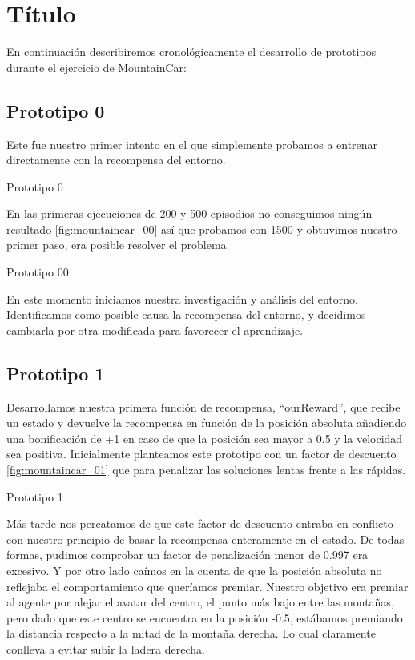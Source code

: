 
\chapter{Título}
\label{Appendix:Key1}

En continuación describiremos cronológicamente el desarrollo de prototipos durante el ejercicio de MountainCar:

\section{Prototipo 0}
Este fue nuestro primer intento en el que simplemente probamos a entrenar directamente con la recompensa del entorno.

%
       {Prototipo 0}

En las primeras ejecuciones de 200 y 500 episodios no conseguimos ningún resultado \ref{fig:mountaincar_00} así que probamos con 1500 y obtuvimos nuestro primer paso, era posible resolver el problema.

%
{Prototipo 00}

En este momento iniciamos nuestra investigación y análisis del entorno. Identificamos como posible causa la recompensa del entorno, y decidimos cambiarla por otra modificada para favorecer el aprendizaje.

\section{Prototipo 1}
Desarrollamos nuestra primera función de recompensa, ``ourReward'', que recibe un estado y devuelve la recompensa en función de la posición absoluta añadiendo una bonificación de +1 en caso de que la posición sea mayor a 0.5 y la velocidad sea positiva. Inicialmente planteamos este prototipo con un factor de descuento \ref{fig:mountaincar_01} que para penalizar las soluciones lentas frente a las rápidas.

%
{Prototipo 1}

Más tarde nos percatamos de que este factor de descuento entraba en conflicto con nuestro principio de basar la recompensa enteramente en el estado. De todas formas, pudimos comprobar un factor de penalización menor de 0.997 era excesivo. Y por otro lado caímos en la cuenta de que la posición absoluta no reflejaba el comportamiento que queríamos premiar. Nuestro objetivo era premiar al agente por alejar el avatar del centro, el punto más bajo entre las montañas, pero dado que este centro se encuentra en la posición -0.5, estábamos premiando la distancia respecto a la mitad de la montaña derecha. Lo cual claramente conlleva a evitar subir la ladera derecha.





